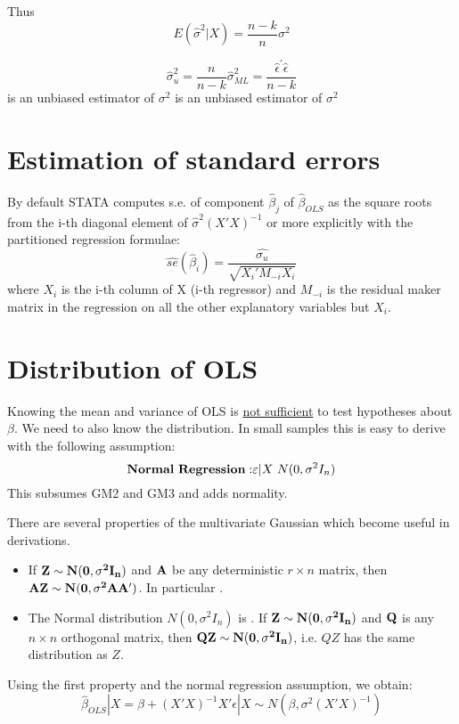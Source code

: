 \documentclass[DIV=14,titlepage=false]{scrreprt}
\begin{document}
Thus \[E(\hat{\sigma}^2|X)=\frac{n-k}{n}\sigma^2\]

\begin{theorem}
    \[\hat{\sigma}^2_{u}=\frac{n}{n-k}\hat{\sigma}^2_{ML}= \frac{\hat{{\epsilon}}^{\prime}\hat{{\epsilon}}}{n-k}\] is an unbiased estimator of \(\sigma^2\)
    is an unbiased estimator of \(\sigma^2\)
\end{theorem}

\section{Estimation of standard errors}

By default STATA computes s.e. of component \(\hat{\beta}_j\) of \(\hat{\beta}_{OLS}\) as 
the square roots from the i-th diagonal element of \(\hat{\sigma}^2(X'X)^{-1}\) or more explicitly with the partitioned regression formulae:
\[\hat{se}(\hat{\beta}_i)=\frac{\hat{\sigma_u}}{\sqrt{X_i'M_{-i}X_i}}\]
where \(X_i\) is the i-th column of X (i-th regressor) and \(M_{-i}\) is the residual maker matrix in the regression on all the other explanatory variables but \(X_i\).

\section{Distribution of OLS}

Knowing the mean and variance of OLS is \underline{not sufficient} to test hypotheses about \(\beta\). We need to also know the distribution.
In small samples this is easy to derive with the following assumption:
\[\bold{Normal \ Regression:} \epsilon|X ~ N(0,\sigma^2I_n)\]
This subsumes GM2 and GM3 and adds normality. 

\vspace{5mm}

\begin{claim} There are several properties of the multivariate Gaussian which become useful in derivations.
    \begin{itemize}
        
        \item If \(\bold{Z\sim N(0,\sigma^2I_n)}\) and \(\bold{A}\) be any deterministic \(r\times n\) matrix, then \(\bold{AZ \sim N(0,\sigma^2AA')}\). In particular \underline{}.
        \item The Normal distribution \(N(0,\sigma^2I_n)\) is \underline{}. If \(\bold{Z \sim N(0,\sigma^2I_n)}\) and \(\bold{Q}\) is any \(n\times n\) orthogonal matrix, then \(\bold{QZ \sim N(0,\sigma^2I_n)}\), i.e. \(QZ\) has the same distribution as \(Z\).
    \end{itemize}
\end{claim}
\vspace{5mm}
\begin{theorem}
    Using the first property and the normal regression assumption, we obtain:
    \[\hat\beta_{OLS}|X = \beta + (X'X)^{-1}X'\epsilon|X \sim N(\beta,\sigma^2(X'X)^{-1})\]
\end{theorem}
\end{document}
